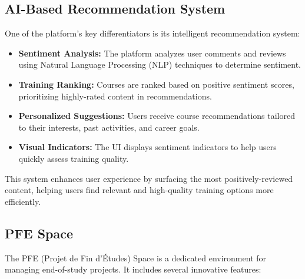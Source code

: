 \documentclass[12pt,a4paper]{report}
\begin{document}
\subsection{AI-Based Recommendation System}
One of the platform's key differentiators is its intelligent recommendation system:

\begin{itemize}
    \item \textbf{Sentiment Analysis:} The platform analyzes user comments and reviews using Natural Language Processing (NLP) techniques to determine sentiment.

    \item \textbf{Training Ranking:} Courses are ranked based on positive sentiment scores, prioritizing highly-rated content in recommendations.

    \item \textbf{Personalized Suggestions:} Users receive course recommendations tailored to their interests, past activities, and career goals.

    \item \textbf{Visual Indicators:} The UI displays sentiment indicators to help users quickly assess training quality.
\end{itemize}

This system enhances user experience by surfacing the most positively-reviewed content, helping users find relevant and high-quality training options more efficiently.

\subsection{PFE Space}
The PFE (Projet de Fin d'Études) Space is a dedicated environment for managing end-of-study projects. It includes several innovative features:
\end{document}
